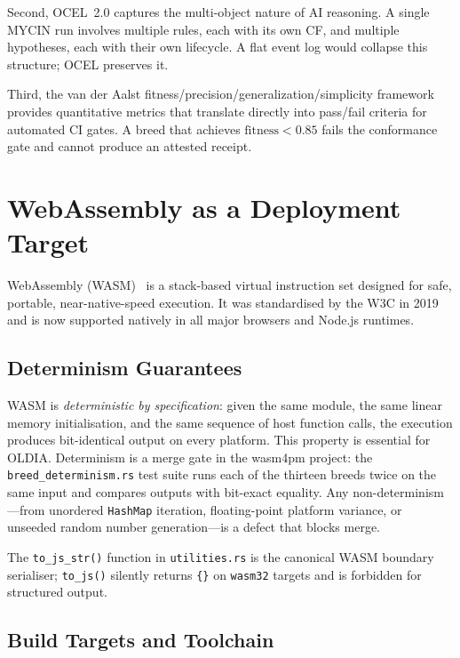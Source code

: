 Second, OCEL~2.0 captures the multi-object nature of AI reasoning.  A single
MYCIN run involves multiple rules, each with its own CF, and multiple
hypotheses, each with their own lifecycle.  A flat event log would collapse
this structure; OCEL preserves it.

Third, the van der Aalst fitness/precision/generalization/simplicity framework
provides quantitative metrics that translate directly into pass/fail criteria
for automated CI gates.  A breed that achieves $\text{fitness} < 0.85$ fails
the conformance gate and cannot produce an attested receipt.

\section{WebAssembly as a Deployment Target}
\label{sec:wasm}

WebAssembly (WASM)~\cite{haas2017} is a stack-based virtual instruction set
designed for safe, portable, near-native-speed execution.  It was standardised
by the W3C in 2019 and is now supported natively in all major browsers and
Node.js runtimes.

\subsection{Determinism Guarantees}
\label{subsec:wasm-determinism}

WASM is \emph{deterministic by specification}: given the same module, the same
linear memory initialisation, and the same sequence of host function calls, the
execution produces bit-identical output on every platform.  This property is
essential for OLDIA.  Determinism is a merge gate in the wasm4pm project: the
\texttt{breed\_determinism.rs} test suite runs each of the thirteen breeds
twice on the same input and compares outputs with bit-exact equality.  Any
non-determinism---from unordered \texttt{HashMap} iteration, floating-point
platform variance, or unseeded random number generation---is a defect that
blocks merge.

The \texttt{to\_js\_str()} function in \texttt{utilities.rs} is the
canonical WASM boundary serialiser; \texttt{to\_js()} silently returns
\texttt{\{\}} on \texttt{wasm32} targets and is forbidden for structured
output.

\subsection{Build Targets and Toolchain}
\label{subsec:wasm-toolchain}

